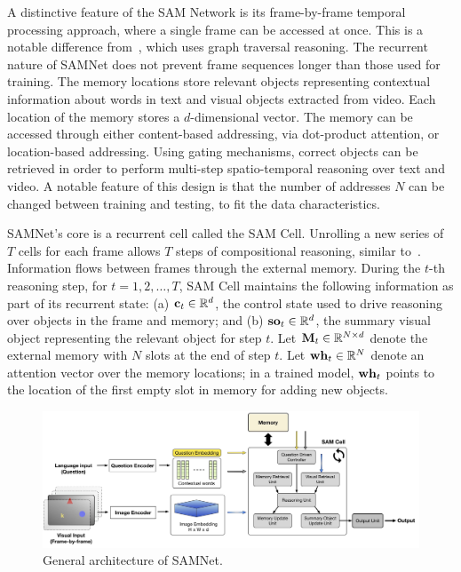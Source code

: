 A distinctive feature of the SAM Network is its frame-by-frame temporal processing approach, where a single frame can be accessed at once. This is a notable difference from~\cite{haurilet2019s}, which uses graph traversal reasoning. The recurrent nature of SAMNet does not prevent frame sequences longer than those used for training.
The memory locations store relevant objects representing contextual information about words in text and visual objects extracted from video. 
Each location of the memory stores a $d$-dimensional vector. %
The memory can be accessed through either content-based addressing, via dot-product attention, or location-based addressing. Using gating mechanisms, correct objects can be retrieved in order to perform multi-step spatio-temporal reasoning over text and video.
A notable feature of this design is that the number of addresses $N$ can be changed between training and testing, to fit the data characteristics.



SAMNet's core is a recurrent cell called the SAM Cell. Unrolling a new series of $T$ cells for each frame allows $T$ steps of compositional reasoning, similar to~\cite{hudson2018compositional}. Information flows between frames through the external memory. 
During the $t$-th reasoning step, for $t=1,2, \dots, T$, SAM Cell maintains the following information as part of its recurrent state:
(a) $\mathbf{c}_t \in \mathbb{R}^d$, the control state used to drive reasoning over objects in the frame and memory; and
(b) $\mathbf{so}_t  \in \mathbb{R}^d$, the summary visual object representing the relevant object for step $t$.
Let $\mathbf{M}_t \in  \mathbb{R}^{N \times d}$ denote the external memory with $N$ slots at the end of step $t$.
Let $\mathbf{wh}_t \in  \mathbb{R}^N$ denote an attention vector over the memory locations;
in a trained model, $\mathbf{wh}_t$ points to the location of the first empty slot in memory for adding new objects.

\begin{figure}
	\centering
	\includegraphics[width=\textwidth]{img/architecture/SAMNETmodel}
	\caption{General architecture of SAMNet.}
	\label{fig:samnet}
\end{figure}

